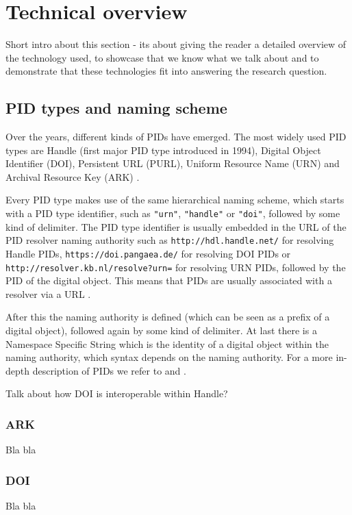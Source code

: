 \section{Technical overview}\label{tech-oview}
Short intro about this section - its about giving the reader a detailed overview of the technology used, to showcase that we know what we talk about and to demonstrate that these technologies fit into answering the research question.

\subsection{PID types and naming scheme}\label{pid-types}
Over the years, different kinds of PIDs have emerged. The most widely used PID types are Handle (first major PID type introduced 
in 1994), Digital Object Identifier (DOI), Persistent URL (PURL), Uniform Resource Name (URN) and 
Archival Resource Key (ARK) \cite{pid-oview, odin, hdl}.

Every PID type makes use of the same hierarchical naming scheme, which starts with a PID type identifier,
 such as \texttt{"urn"}, \texttt{"handle"} or \texttt{"doi"}, followed by some kind of delimiter. The PID type identifier is usually embedded in the URL of the PID resolver naming authority 
such as \texttt{http://hdl.handle.net/} for resolving Handle PIDs, \texttt{https://doi.pangaea.de/} for resolving DOI PIDs or \texttt{http://resolver.kb.nl/resolve?urn=} for resolving URN PIDs, followed by the PID of the digital object. This means that PIDs are usually associated with a resolver via a URL \cite{ids, icn-bd}.

After this the naming authority is defined (which can be seen as a prefix of a digital object), followed again 
by some kind of delimiter. At last there is a Namespace Specific String which is the identity of a digital object within the naming authority, which syntax depends on the naming
authority.
For a more in-depth description of PIDs we refer to \cite{icn-bd} and \cite{pid-oview}.

Talk about how DOI is interoperable within Handle?

\subsubsection{ARK}
Bla bla

\subsubsection{DOI}
Bla bla


